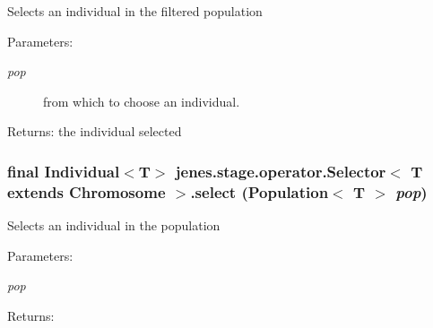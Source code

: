 Selects an individual in the filtered population 

\begin{Desc}
\item[Parameters:]
\begin{description}
\item[{\em pop}]from which to choose an individual. \end{description}
\end{Desc}
\begin{Desc}
\item[Returns:]the individual selected \end{Desc}
\hypertarget{classjenes_1_1stage_1_1operator_1_1_selector_3_01_t_01extends_01_chromosome_01_4_9ef7b0bef2ffcb84eeb231ae37ab0239}{
\subsubsection[select]{\setlength{\rightskip}{0pt plus 5cm}final Individual$<$T$>$ jenes.stage.operator.Selector$<$ T extends Chromosome $>$.select (Population$<$ T $>$ {\em pop})}}
\label{classjenes_1_1stage_1_1operator_1_1_selector_3_01_t_01extends_01_chromosome_01_4_9ef7b0bef2ffcb84eeb231ae37ab0239}


Selects an individual in the population \begin{Desc}
\item[Parameters:]
\begin{description}
\item[{\em pop}]\end{description}
\end{Desc}
\begin{Desc}
\item[Returns:]\end{Desc}


